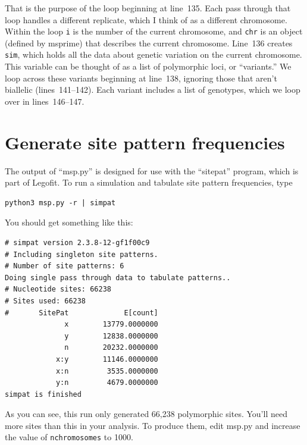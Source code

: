 \documentclass[11pt]{article}
\begin{document}
That is the purpose of the loop beginning at line~135. Each pass
through that loop handles a different replicate, which I think of as a
different chromosome. Within the loop \texttt{i} is the number of the
current chromosome, and \texttt{chr} is an object (defined by msprime)
that describes the current chromosome. Line~136 creates \texttt{sim},
which holds all the data about genetic variation on the current
chromosome. This variable can be thought of as a list of polymorphic
loci, or ``variants.'' We loop across these variants beginning at
line~138, ignoring those that aren't biallelic (lines~141--142).
Each variant includes a list of genotypes, which we loop over in
lines~146--147.

\section{Generate site pattern frequencies}

The output of ``msp.py'' is designed for use with the ``sitepat''
program, which is part of Legofit. To run a simulation and tabulate
site pattern frequencies, type
\begin{verbatim}
python3 msp.py -r | simpat
\end{verbatim}
You should get something like this:
\begin{verbatim}
# simpat version 2.3.8-12-gf1f00c9
# Including singleton site patterns.
# Number of site patterns: 6
Doing single pass through data to tabulate patterns..
# Nucleotide sites: 66238
# Sites used: 66238
#       SitePat             E[count]
              x        13779.0000000
              y        12838.0000000
              n        20232.0000000
            x:y        11146.0000000
            x:n         3535.0000000
            y:n         4679.0000000
simpat is finished
\end{verbatim}
As you can see, this run only generated 66,238 polymorphic sites.
You'll need more sites than this in your analysis. To produce them,
edit msp.py and increase the value of \texttt{nchromosomes} to 1000.
\end{document}
